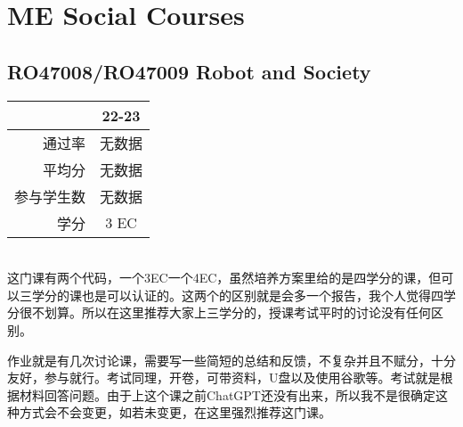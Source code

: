 \vspace{\betsubsec} %
\section{ME Social Courses}

\subsection[RO47008/RO47009 Robot and Society]{RO47008/RO47009 Robot and Society}\hypertarget{RO47008}{} 
\begin{minipage}{0.45\textwidth}
\centering
{}
\end{minipage}%
\begin{minipage}{0.45\textwidth}
\raggedleft
\begin{tabular}{r|c}
\textbf{ } & \textbf{22-23} \\ \hline
通过率 & 无数据 \\ 
平均分 &  无数据\\ 
参与学生数 &  无数据\\
学分 & 3 EC\\
\end{tabular}
\end{minipage}\\

这门课有两个代码，一个3EC一个4EC，虽然培养方案里给的是四学分的课，但可以三学分的课也是可以认证的。这两个的区别就是会多一个报告，我个人觉得四学分很不划算。所以在这里推荐大家上三学分的，授课考试平时的讨论没有任何区别。

作业就是有几次讨论课，需要写一些简短的总结和反馈，不复杂并且不赋分，十分友好，参与就行。考试同理，开卷，可带资料，U盘以及使用谷歌等。考试就是根据材料回答问题。由于上这个课之前ChatGPT还没有出来，所以我不是很确定这种方式会不会变更，如若未变更，在这里强烈推荐这门课。

